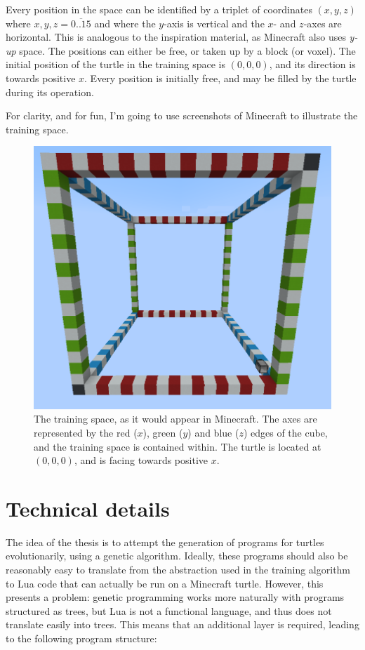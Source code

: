 \documentclass{report}
\begin{document}
Every position in the space can be identified by a triplet of coordinates $(x, y, z)$ where $x, y, z = \overline{0..15}$ and where the $y$-axis is vertical and the $x$- and $z$-axes are horizontal. This is analogous to the inspiration material, as Minecraft also uses \emph{y-up} space. The positions can either be free, or taken up by a block (or voxel). The initial position of the turtle in the training space is $(0, 0, 0)$, and its direction is towards positive $x$. Every position is initially free, and may be filled by the turtle during its operation.

For clarity, and for fun, I'm going to use screenshots of Minecraft to illustrate the training space.

\begin{figure}[H]
    \centering
    \includegraphics[scale=0.4]{minecraft1}
    \caption{The training space, as it would appear in Minecraft. The axes are represented by the red ($x$), green ($y$) and blue ($z$) edges of the cube, and the training space is contained within. The turtle is located at $(0, 0, 0)$, and is facing towards positive $x$.}
\end{figure}

\chapter{Technical details}
The idea of the thesis is to attempt the generation of programs for turtles evolutionarily, using a genetic algorithm. Ideally, these programs should also be reasonably easy to translate from the abstraction used in the training algorithm to Lua code that can actually be run on a Minecraft turtle. However, this presents a problem: genetic programming works more naturally with programs structured as trees, but Lua is not a functional language, and thus does not translate easily into trees. This means that an additional layer is required, leading to the following program structure:
\end{document}
